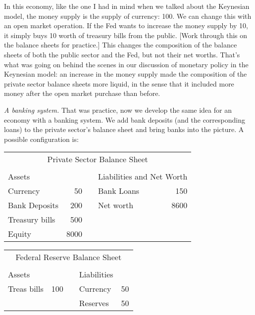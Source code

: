 \documentclass[letterpaper,12pt]{article}
\begin{document}
     In this economy, like the one I had in mind when we talked about the
Keynesian model, the money supply is the supply of currency:  100.  We can change this with an
open market operation.  If the Fed wants to increase the money supply by 10, it simply buys 10
worth of treasury bills from the public.  [Work through this on the balance sheets for practice.]
This changes the composition of the balance sheets of both the public sector and the Fed, but not
their net worths.  That's what was going on behind the scenes in our discussion of monetary policy
in the Keynesian model:  an increase in the money supply made the composition of the private
sector balance sheets more liquid, in the sense that it included more money after the open market
purchase than before.

{\em A banking system.}
That was practice, now we develop the same idea for an economy with a banking system.  We add bank
deposits (and the corresponding loans) to the private sector's balance sheet and bring banks into
the picture.  A possible configuration is:
%
\begin{center}
\begin{tabular}{lrclr}
\multicolumn{5}{c}{Private Sector Balance Sheet}                             \\
                                                                &       \\
            Assets                &&&
                        \multicolumn{2}{l}{Liabilities and Net Worth}   \\
            Currency        &    50   &&   Bank Loans &    150          \\
            Bank Deposits   &   200   &&   Net worth  &   8600          \\
            Treasury bills  &   500   &&                                \\
            Equity          &  8000   &&                                \\
\end{tabular}
\end{center}
%
\begin{center}
\begin{tabular}{lrclr}
\multicolumn{5}{c}{Federal Reserve Balance Sheet}               \\
                                                        &       \\
                    Assets      &&&          Liabilities        \\
                    Treas bills & 100    &&  Currency   & 50    \\
                                &        &&  Reserves   & 50    \\
\end{tabular}
\end{center}
\end{document}
